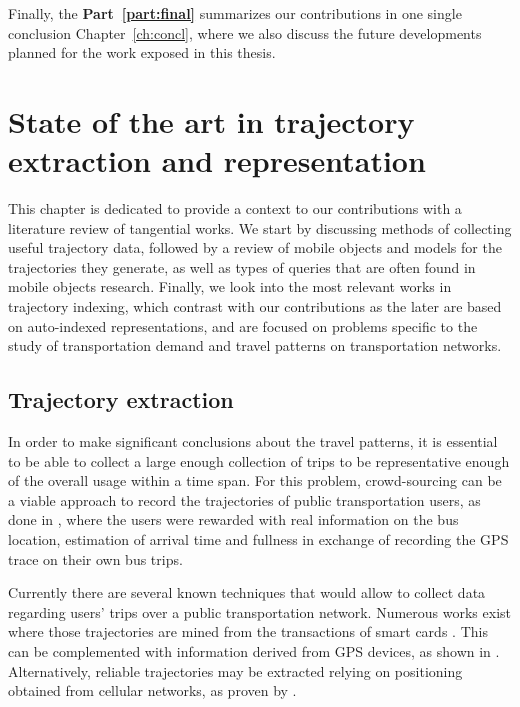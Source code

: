 \documentclass[a4paper,10pt,twoside]{book}
\begin{document}
	Finally, the \textbf{Part~\ref{part:final}} summarizes our contributions in one single conclusion Chapter~\ref{ch:concl}, where we also discuss the future developments planned for the work exposed in this thesis.
	
\chapter{State of the art in trajectory extraction and representation}
\label{ch:state}
    This chapter is dedicated to provide a context to our contributions with a literature review of tangential works. We start by discussing methods of collecting useful trajectory data, followed by a review of mobile objects and models for the trajectories they generate, as well as types of queries that are often found in mobile objects research. Finally, we look into the most relevant works in trajectory indexing, which contrast with our contributions as the later are based on auto-indexed representations, and are focused on problems specific to the study of transportation demand and travel patterns on transportation networks.

	\section{Trajectory extraction}
	\label{sec:dm}
	In order to make significant conclusions about the travel patterns, it is essential to be able to collect a large enough collection of trips to be representative enough of the overall usage within a time span. For this problem, crowd-sourcing can be a viable approach to record the trajectories of public transportation users, as done in \cite{zimmerman2011field}, where the users were rewarded with real information on the bus location, estimation of arrival time and fullness in exchange of recording the GPS trace on their own bus trips.
	
	Currently there are several known techniques that would allow to collect data regarding users' trips over a public transportation network. Numerous works exist where those trajectories are mined from the transactions of smart cards \cite{bhaskar2015passenger,wang2014aggregated}. This can be complemented with information derived from GPS devices, as shown in \cite{ma2014development}. Alternatively, reliable trajectories may be extracted relying on positioning obtained from cellular networks, as proven by \cite{liu2017exploring}.
\end{document}
